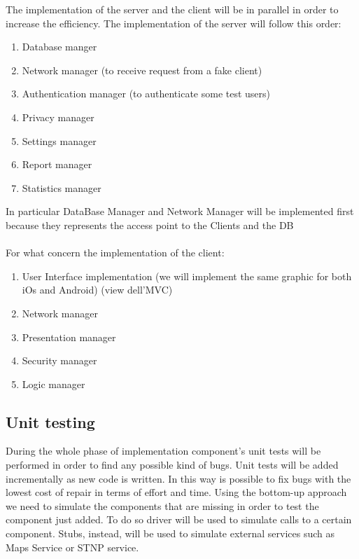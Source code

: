 \documentclass{article}
\begin{document}
The implementation of the server and the client will be in parallel in order to increase the efficiency.
The implementation of the server will follow this order:
\begin{enumerate}
    \item Database manger
    \item Network manager (to receive request from a fake client)
    \item Authentication manager (to authenticate some test users)
    \item Privacy manager
    \item Settings manager
    \item Report manager
    \item Statistics manager
\end{enumerate}
In particular DataBase Manager and Network Manager will be implemented first because they represents the access 
point to the Clients and the DB \\\\

For what concern the implementation of the client:
\begin{enumerate}
    \item User Interface implementation (we will implement the same graphic for both iOs and Android) (view dell'MVC)
    \item Network manager
    \item Presentation manager
    \item Security manager
    \item Logic manager
\end{enumerate}
\subsection{Unit testing}
During the whole phase of implementation component's unit tests will be performed in order to find any possible kind of bugs.
Unit tests will be added incrementally as new code is written. In this way is possible to fix bugs with the lowest cost of 
repair in terms of effort and time. Using the bottom-up approach we need to simulate the components that are missing in order
to test the component just added. To do so driver will be used to simulate calls to a certain component. Stubs, instead, will be 
used to simulate external services such as Maps Service or STNP service.    
\end{document}

